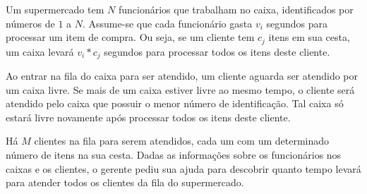 Um supermercado tem $N$ funcionários que trabalham no caixa, identificados por números de $1$ a $N$. Assume-se que cada funcionário gasta $v_i$ segundos para processar um item de compra. Ou seja, se um cliente tem $c_j$ itens em sua cesta, um caixa levará $v_i*c_j$ segundos para processar todos os itens deste cliente.

Ao entrar na fila do caixa para ser atendido, um cliente aguarda ser atendido por um caixa livre. Se mais de um caixa estiver livre ao mesmo tempo, o cliente será atendido pelo caixa que possuir o menor número de identificação. Tal caixa só estará livre novamente após processar todos os itens deste cliente.

Há $M$ clientes na fila para serem atendidos, cada um com um determinado número de itens na sua cesta. Dadas as informações sobre os funcionários nos caixas e os clientes, o gerente pediu sua ajuda para descobrir quanto tempo levará para atender todos os clientes da fila do supermercado.
